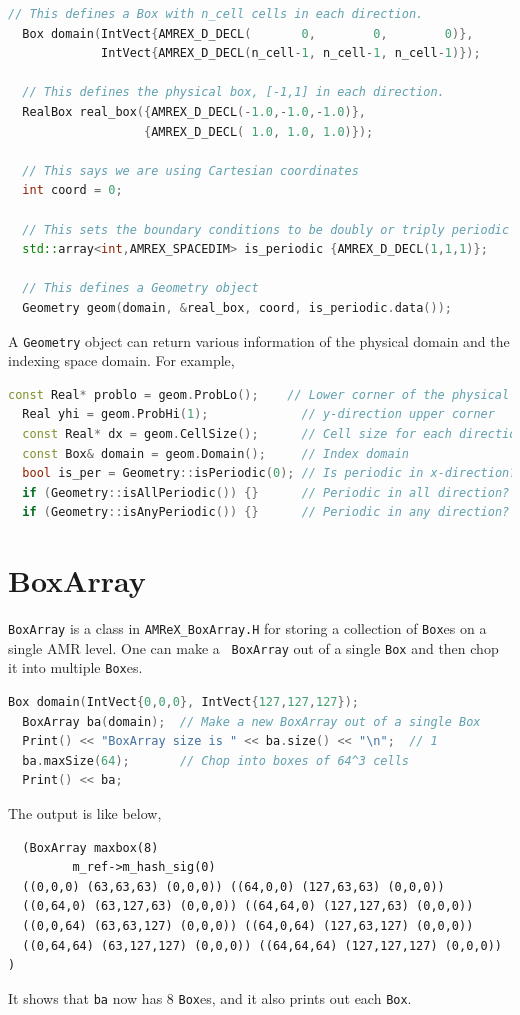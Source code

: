 {\begin{lstlisting}[language=cpp]
  // This defines a Box with n_cell cells in each direction.
  Box domain(IntVect{AMREX_D_DECL(       0,        0,        0)},
             IntVect{AMREX_D_DECL(n_cell-1, n_cell-1, n_cell-1)});

  // This defines the physical box, [-1,1] in each direction.
  RealBox real_box({AMREX_D_DECL(-1.0,-1.0,-1.0)},
                   {AMREX_D_DECL( 1.0, 1.0, 1.0)});
  
  // This says we are using Cartesian coordinates
  int coord = 0;
  
  // This sets the boundary conditions to be doubly or triply periodic
  std::array<int,AMREX_SPACEDIM> is_periodic {AMREX_D_DECL(1,1,1)};
  
  // This defines a Geometry object
  Geometry geom(domain, &real_box, coord, is_periodic.data());
\end{lstlisting}

A {\tt Geometry} object can return various information of the physical
domain and the indexing space domain.  For example,
\begin{lstlisting}[language=cpp]
  const Real* problo = geom.ProbLo();    // Lower corner of the physical domain
  Real yhi = geom.ProbHi(1);             // y-direction upper corner
  const Real* dx = geom.CellSize();      // Cell size for each direction
  const Box& domain = geom.Domain();     // Index domain
  bool is_per = Geometry::isPeriodic(0); // Is periodic in x-direction?
  if (Geometry::isAllPeriodic()) {}      // Periodic in all direction?
  if (Geometry::isAnyPeriodic()) {}      // Periodic in any direction?
\end{lstlisting}


\section{BoxArray}
\label{sec:basics:ba}

{\tt BoxArray} is a class in {\tt AMReX\_BoxArray.H} for storing a
collection of {\tt Box}es on a single AMR level.  One can make a {\tt
  BoxArray} out of a single {\tt Box} and then chop it into multiple
{\tt Box}es.
\begin{lstlisting}[language=cpp]
  Box domain(IntVect{0,0,0}, IntVect{127,127,127});
  BoxArray ba(domain);  // Make a new BoxArray out of a single Box
  Print() << "BoxArray size is " << ba.size() << "\n";  // 1
  ba.maxSize(64);       // Chop into boxes of 64^3 cells
  Print() << ba;
\end{lstlisting}
The output is like below,
\begin{verbatim}
  (BoxArray maxbox(8)
         m_ref->m_hash_sig(0)
  ((0,0,0) (63,63,63) (0,0,0)) ((64,0,0) (127,63,63) (0,0,0))
  ((0,64,0) (63,127,63) (0,0,0)) ((64,64,0) (127,127,63) (0,0,0))
  ((0,0,64) (63,63,127) (0,0,0)) ((64,0,64) (127,63,127) (0,0,0))
  ((0,64,64) (63,127,127) (0,0,0)) ((64,64,64) (127,127,127) (0,0,0)) )
\end{verbatim}
It shows that {\tt ba} now has 8 {\tt Box}es, and it also prints out
each {\tt Box}.  

}
